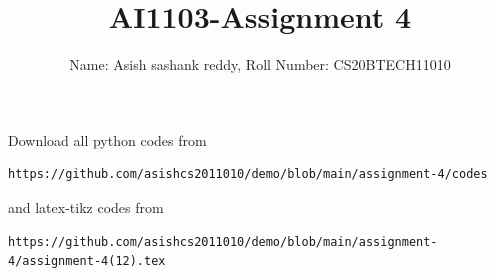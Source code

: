 \documentclass[journal,12pt,twocolumn]{IEEEtran}
\DeclareMathOperator*{\Res}{Res}
\begin{document}
\newcommand{\BEQA}{\begin{eqnarray}}
\newcommand{\EEQA}{\end{eqnarray}}
\newcommand{\define}{\stackrel{\triangle}{=}}

\raggedbottom
\setlength{\parindent}{0pt}
\providecommand{\mbf}{\mathbf}
\providecommand{\pr}[1]{\ensuremath{\Pr\left(#1\right)}}
\providecommand{\qfunc}[1]{\ensuremath{Q\left(#1\right)}}
\providecommand{\sbrak}[1]{\ensuremath{{}\left[#1\right]}}
\providecommand{\lsbrak}[1]{\ensuremath{{}\left[#1\right.}}
\providecommand{\rsbrak}[1]{\ensuremath{{}\left.#1\right]}}
\providecommand{\brak}[1]{\ensuremath{\left(#1\right)}}
\providecommand{\lbrak}[1]{\ensuremath{\left(#1\right.}}
\providecommand{\rbrak}[1]{\ensuremath{\left.#1\right)}}
\providecommand{\cbrak}[1]{\ensuremath{\left\{#1\right\}}}
\providecommand{\lcbrak}[1]{\ensuremath{\left\{#1\right.}}
\providecommand{\rcbrak}[1]{\ensuremath{\left.#1\right\}}}
\theoremstyle{remark}
\newtheorem{rem}{Remark}
\newcommand{\sgn}{\mathop{\mathrm{sgn}}}
\providecommand{\abs}[1]{\vert#1\vert}
\providecommand{\res}[1]{\Res\displaylimits_{#1}} 
\providecommand{\norm}[1]{\lVert#1\rVert}
\providecommand{\mtx}[1]{\mathbf{#1}}
\providecommand{\mean}[1]{E[ #1 ]}
\providecommand{\fourier}{\overset{\mathcal{F}}{ \rightleftharpoons}}
\providecommand{\system}{\overset{\mathcal{H}}{ \longleftrightarrow}}
\newcommand{\solution}{\noindent \textbf{Solution: }}
\newcommand{\cosec}{\,\text{cosec}\,}
\providecommand{\dec}[2]{\ensuremath{\overset{#1}{\underset{#2}{\gtrless}}}}
\newcommand{\myvec}[1]{\ensuremath{\begin{pmatrix}#1\end{pmatrix}}}
\newcommand{\mydet}[1]{\ensuremath{\begin{vmatrix}#1\end{vmatrix}}}
\makeatletter
{}
\makeatother
\let\StandardTheFigure\thefigure
\let\vec\mathbf
\renewcommand{\thefigure}{\theproblem}
\def\putbox#1#2#3{\makebox[0in][l]{\makebox[#1][l]{}\raisebox{\baselineskip}[0in][0in]{\raisebox{#2}[0in][0in]{#3}}}}
     \def\rightbox#1{\makebox[0in][r]{#1}}
     \def\centbox#1{\makebox[0in]{#1}}
     \def\topbox#1{\raisebox{-\baselineskip}[0in][0in]{#1}}
     \def\midbox#1{\raisebox{-0.5\baselineskip}[0in][0in]{#1}}
\vspace{3cm}
\title{AI1103-Assignment 4}
\author{Name: Asish sashank reddy, Roll Number: CS20BTECH11010}
\maketitle
\newpage
\bigskip
\renewcommand{\thefigure}{\theenumi}
\renewcommand{\thetable}{\theenumi}
Download all python codes from 
\begin{lstlisting}
https://github.com/asishcs2011010/demo/blob/main/assignment-4/codes
\end{lstlisting}
%
and latex-tikz codes from 
%
\begin{lstlisting}
https://github.com/asishcs2011010/demo/blob/main/assignment-4/assignment-4(12).tex 
\end{lstlisting}
\end{document}
